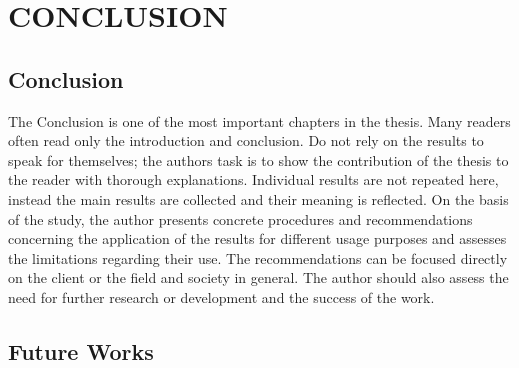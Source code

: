 \chapter{CONCLUSION}

\section{Conclusion}
The Conclusion is one of the most important chapters in the thesis. Many readers often 
read  only  the  introduction  and  conclusion.  Do  not  rely  on  the  results  to  speak  for 
themselves; the authors task is to show the contribution of the thesis to the reader with 
thorough explanations. Individual results are not repeated here, instead the main results 
are collected and their meaning is reflected.  
On   the   basis   of   the   study,   the   author   presents   concrete   procedures   and 
recommendations concerning the application of the results for different usage purposes 
and assesses the limitations regarding their use. The recommendations can be focused 
directly on the client or the field and society in general. The author should also assess 
the need for further research or development and the success of the work.  

\section{Future Works}